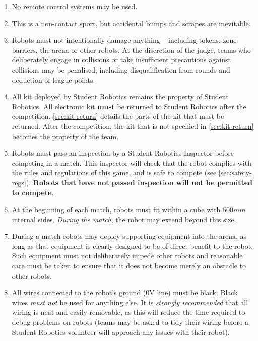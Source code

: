 \begin{enumerate}
\item No remote control systems may be used.
\item This is a non-contact sport, but accidental bumps and scrapes are inevitable.
\item Robots must not intentionally damage anything -- including tokens, zone barriers, the arena or other robots.
      At the discretion of the judge, teams who deliberately engage in collisions or take insufficient precautions against collisions may be penalised, including disqualification from rounds and deduction of league points.
\item All kit deployed by Student Robotics remains the property of Student Robotics.
      All electronic kit \textbf{must} be returned to Student Robotics after the competition.
      \autoref{sec:kit-return} details the parts of the kit that must be returned.
      After the competition, the kit that is not specified in \autoref{sec:kit-return} becomes the property of the team.


\item Robots must pass an inspection by a Student Robotics Inspector before competing in a match.
      This inspector will check that the robot complies with the rules and regulations of this game, and is safe to compete (see \autoref{sec:safety-regs}).
      \textbf{Robots that have not passed inspection will not be permitted to compete}.

\item At the beginning of each match, robots must fit within a cube with $500mm$ internal sides.
      \textit{During the match}, the robot may extend beyond this size.

\item During a match robots may deploy supporting equipment into the arena, as long as that equipment is clearly designed to be of direct benefit to the robot.
      Such equipment must not deliberately impede other robots and reasonable care must be taken to ensure that it does not become merely an obstacle to other robots.

\item All wires connected to the robot's ground (0V line) must be black.
      Black wires \emph{must not} be used for anything else.
      It is \emph{strongly recommended} that all wiring is neat and easily removable, as this will reduce the time required to debug problems on robots
       (teams may be asked to tidy their wiring before a Student Robotics volunteer will approach any issues with their robot).


\end{enumerate}
